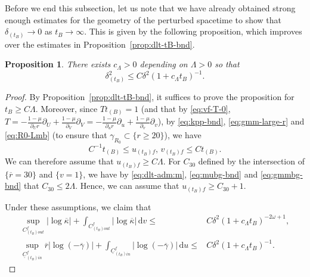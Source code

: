 \documentclass[10pt, reqno]{amsart}
\newtheorem{proposition}[theorem]{Proposition}
\theoremstyle{definition}
\theoremstyle{remark}
\theoremstyle{conjecture}
\numberwithin{equation}{section}
\newcommand{\abs}[1]{\vert#1\vert}
\newcommand{\ud}{\mathrm{d}}
\newcommand{\rd}{\partial}
\newcommand{\0}{\emptyset}
\newcommand{\gmm}{\gamma}
\newcommand{\dlt}{\delta}
\newcommand{\kpp}{\kappa}
\newcommand{\lmb}{\lambda}
\newcommand{\Lmb}{\Lambda}
\newcommand{\omg}{\omega}
\newcommand{\uC}{\underline{C}}
\newcommand{\dur}{\nu}
\newcommand{\dvr}{\lmb}
\newcommand{\f}{\frac}
\newcommand{\de}{\delta}
\newcommand{\rbg}{\overline{r}}					%
\newcommand{\kppbg}{\overline{\kpp}}					%
\newcommand{\gmmbg}{\overline{\gmm}}					%
\begin{document}
Before we end this subsection, let us note that we have already obtained strong enough estimates for the geometry of the perturbed spacetime to show that $\de_{(t_B)}\to 0$ as $t_B\to \infty$. This is given by the following proposition, which improves over the estimates in Proposition~\ref{prop:dlt-tB-bnd}.

\begin{proposition}\label{prop:dlt-tB-decay}
There exists $c_{\Lmb} > 0$ depending on $\Lmb > 0$ so that
\begin{equation} \label{eq:dlt-tB-decay}
\dlt_{(t_{B})}^{2} \leq C \dlt^{2} (1+ c_{\Lmb} t_{B})^{-1}.
\end{equation}
\end{proposition}
\begin{proof}

By Proposition~\ref{prop:dlt-tB-bnd}, it suffices to prove the proposition for $t_{B}\geq C \Lambda$. Moreover, since $Tt_{(B)}=1$ (and that by \eqref{eq:vf-T-0}, $T=-\f{1-\mu}{\rd_U r}\rd_U+\f{1-\mu}{\rd_V} \rd_V=-\f{1-\mu}{\rd_u r}\rd_u+\f{1-\mu}{\rd_v} \rd_v$), by \eqref{eq:kpp-bnd}, \eqref{eq:gmm-large-r} and \eqref{eq:R0-Lmb} (to ensure that $\gamma_{R_0}\subset\{r\geq 20\}$), we have 
\begin{equation}\label{eq:tB-uB-vB}
C^{-1} t_{(B)}\leq u_{(t_B)f},\, v_{(t_B)f}\leq Ct_{(B)}.
\end{equation}
We can therefore assume that $u_{(t_B)f}\geq C \Lambda$. For $C_{30}$ defined by the intersection of $\{\rbg=30\}$ and $\{v=1\}$, we have by \eqref{eq:dlt-adm:m}, \eqref{eq:mubg-bnd} and \eqref{eq:gmmbg-bnd} that $C_{30}\leq 2\Lambda$. Hence, we can assume that $u_{(t_B)f}\geq C_{30}+1$.

Under these assumptions, we claim that
\begin{align} 
	\sup_{C_{(t_{B}) out}^{f}} \abs{\log \kppbg} + \int_{C_{(t_{B}) out}^{f}} \abs{\log \kppbg} \, \ud v 
\leq & C \dlt^{2} (1+ c_{\Lmb} t_{B})^{-2 \omg + 1},		\label{eq:dlt-tB-decay:pf-1}\\
 	\sup_{\uC_{(t_{B}) in}^{f}} \rbg \abs{\log (-\gmmbg)} + \int_{\uC_{(t_{B}) in}^{f}} \abs{\log (-\gmmbg)} \, \ud u
\leq & C \dlt^{2} (1+ c_{\Lmb} t_{B})^{-1} .		\label{eq:dlt-tB-decay:pf-2} 
\end{align}


\end{proof}
\end{document}
